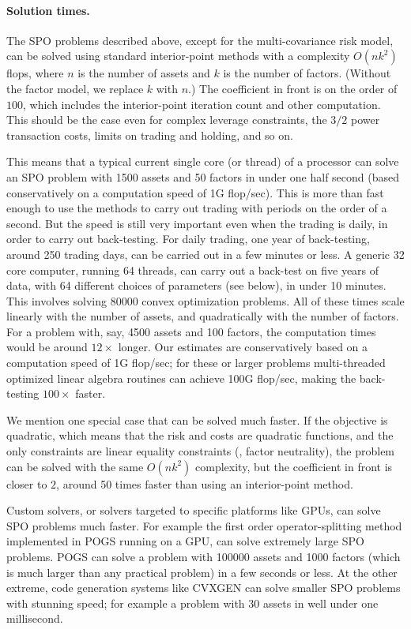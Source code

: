 \documentclass[openany]{now}
\begin{document}
\paragraph{Solution times.}
The SPO problems described above, except for the multi-covariance risk model,
can be solved using standard interior-point methods with a complexity $O(nk^2)$
flops, where $n$ is the number of assets and $k$ is the number of factors.
(Without the factor model, we replace $k$ with $n$.)
The coefficient in front is on the order of $100$, which includes the
interior-point iteration count and other computation.
This should be the case even for complex leverage constraints,
the $3/2$ power transaction costs, limits on trading and holding, and so on.

This means that a typical current single core (or thread) of a processor can solve an
SPO problem with 1500 assets and 50 factors in under one half second
(based conservatively on a computation speed of 1G flop/sec).
This is more than fast enough to use the methods to carry out trading with
periods on the order of a second.  But the speed is still very
important even when the trading is daily, in order to carry out back-testing.
For daily trading, one year of back-testing, around 250 trading days, can be
carried out in a few minutes or less.  A generic 32 core computer, running 64 threads,
can carry out a back-test on five years of data, with 64 different choices of
parameters (see below), in under 10 minutes.  This involves solving 80000
convex optimization problems.
All of these times scale linearly with the number of assets, and quadratically with
the number of factors.  For a problem with, say, 4500 assets and 100 factors,
the computation times would be around $12 \times$ longer.
Our estimates are conservatively based on a computation speed of 1G flop/sec;
for these or larger problems multi-threaded optimized linear algebra routines can
achieve 100G flop/sec, making the back-testing $100 \times$ faster.

We mention one special case that can be solved much faster.  If the objective
is quadratic, which means that the risk and costs are quadratic functions,
and the only constraints are linear equality constraints (\eg,
factor neutrality), the problem can be solved with the same $O(nk^2)$ complexity,
but the coefficient in front is closer to $2$, around 50 times faster than
using an interior-point method.

Custom solvers, or solvers targeted to specific platforms like GPUs,
can solve SPO problems much faster.
For example the first order operator-splitting method implemented in
POGS \cite{fougner2015pogs} running on a GPU, can solve extremely large
SPO problems.
POGS can solve a problem with 100000 assets and 1000 factors
(which is much larger than any practical problem) in a few seconds or less.
At the other extreme, code generation systems like CVXGEN \cite{mattingley2012cvxgen}
can solve smaller SPO problems with stunning speed; for example a problem
with 30 assets in well under one millisecond.
\end{document}
